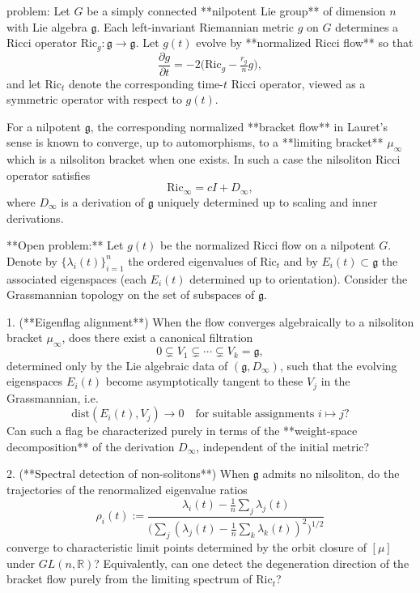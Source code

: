 problem:  
Let \( G \) be a simply connected **nilpotent Lie group** of dimension \( n \) with Lie algebra \( \mathfrak{g} \). Each left-invariant Riemannian metric \( g \) on \( G \) determines a Ricci operator \( \mathrm{Ric}_g \!:\! \mathfrak{g} \to \mathfrak{g} \). Let \( g(t) \) evolve by **normalized Ricci flow** so that  
\[
\frac{\partial g}{\partial t} = -2 \big( \mathrm{Ric}_g - \tfrac{r_g}{n} g \big),
\]
and let \( \mathrm{Ric}_t \) denote the corresponding time-\(t\) Ricci operator, viewed as a symmetric operator with respect to \( g(t) \).

For a nilpotent \( \mathfrak{g} \), the corresponding normalized **bracket flow** in Lauret’s sense is known to converge, up to automorphisms, to a **limiting bracket** \( \mu_\infty \) which is a nilsoliton bracket when one exists.  In such a case the nilsoliton Ricci operator satisfies  
\[
\mathrm{Ric}_{\infty} = c I + D_\infty,
\]
where \( D_\infty \) is a derivation of \( \mathfrak{g} \) uniquely determined up to scaling and inner derivations.

**Open problem:**  
Let \( g(t) \) be the normalized Ricci flow on a nilpotent \( G \).  Denote by \( \{\lambda_i(t)\}_{i=1}^n \) the ordered eigenvalues of \( \mathrm{Ric}_t \) and by \( E_i(t) \subset \mathfrak{g} \) the associated eigenspaces (each \(E_i(t)\) determined up to orientation).  Consider the Grassmannian topology on the set of subspaces of \( \mathfrak{g} \).

1. (**Eigenflag alignment**)  When the flow converges algebraically to a nilsoliton bracket \( \mu_\infty \), does there exist a canonical filtration  
   \[
   0 \subsetneq V_1 \subsetneq \cdots \subsetneq V_k = \mathfrak{g},
   \]
   determined only by the Lie algebraic data of \( (\mathfrak{g}, D_\infty) \), such that the evolving eigenspaces \( E_i(t) \) become asymptotically tangent to these \( V_j \) in the Grassmannian, i.e.  
   \[
   \mathrm{dist}(E_i(t),V_j)\to 0 \quad \text{for suitable assignments } i\mapsto j?
   \]
   Can such a flag be characterized purely in terms of the **weight-space decomposition** of the derivation \(D_\infty\), independent of the initial metric?

2. (**Spectral detection of non-solitons**)  When \(\mathfrak{g}\) admits no nilsoliton, do the trajectories of the renormalized eigenvalue ratios
   \[
   \rho_i(t) := \frac{\lambda_i(t)-\frac{1}{n}\sum_j \lambda_j(t)}{\big(\sum_j (\lambda_j(t)-\frac{1}{n}\sum_k \lambda_k(t))^2\big)^{1/2}}
   \]
   converge to characteristic limit points determined by the orbit closure of \([\mu]\) under \(GL(n,\mathbb{R})\)?  Equivalently, can one detect the degeneration direction of the bracket flow purely from the limiting spectrum of \(\mathrm{Ric}_t\)?

